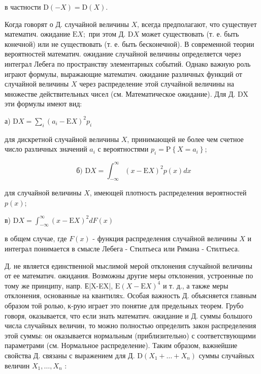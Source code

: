 \documentclass[10pt]{article}
\begin{document}
в частности $\mathrm{D}(-X)=\mathrm{D}(X)$.



Когда говорят о Д. случайной величины $X$, всегда предполагают, что существует математич. ожидание $\mathrm{E} X ;$ при этом Д. $\mathrm{D} X$ может существовать (т. е. быть конечной) или не существовать (т. е. быть бесконечной). В современной теории вероятностей математич. ожидание случайной величины определяется через интеграл Лебега по пространству элементарных событий. Однако важную роль играют формулы, выражающие математич. ожидание различных функций от случайной величины $X$ через распределение этой случайной величины на множестве действительных чисел (см. Математическое ожидание). Для Д. DX эти формулы имеют вид:



а) $\mathrm{D} X=\sum_{i}\left(a_{i}-\mathrm{E} X\right)^{2} p_{i}$



для дискретной случайной величины $X$, принимающей не более чем счетное число различных значений $a_{i}$ с вероятностями $p_{i}=\mathrm{P}\left\{X=a_{i}\right\}$;



\[

\text { б) } \mathrm{D} X=\int_{-\infty}^{\infty}(x-\mathrm{E} X)^{2} p(x) d x

\]



для случайной величины $X$, имеющей плотность распределения вероятностей $p(x)$;



в) $\mathrm{D} X=\int_{-\infty}^{\infty}(x-\mathrm{E} X)^{2} d F(x)$



в общем случае, где $F(x)$ - функция распределения случайной величины $X$ и интеграл понимается в смысле Лебега - Стилтьеса или Римана - Стилтьеса.



Д. не является единственной мыслимой мерой отклонения случайной величины от ее математич. ожидания. Возможны другие меры отклонения, устроенные по тому же принципу, напр. Е|X-EX|, $\mathrm{E}(X-\mathrm{E} X)^{4}$ и т. д., а также меры отклонения, основанные на квантиляx. Особая важность Д. объясняется главным образом той ролью, к-рую играет это понятие для предельных теорем. Грубо говоря, оказывается, что если знать математич. ожидание и Д. суммы большого числа случайных величин, то можно полностью определить закон распределения этой суммы: он оказывается нормальным (приблизительно) с соответствующими параметрами (см. Нормальное распределение). Таким образом, важнейшие свойства Д. связаны с выражением для Д. $\mathrm{D}\left(X_{1}+\ldots+X_{n}\right)$ суммы случайных величин $X_{1}, \ldots, X_{n}$ :
\end{document}
